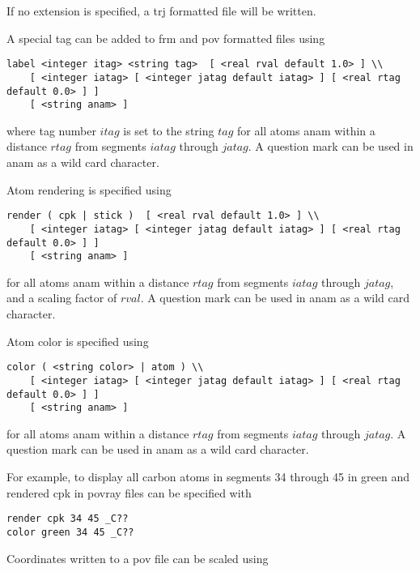 If no extension is specified, a {\rm trj} formatted file will be written.

A special tag can be added to {\rm frm} and {\rm pov} formatted files  using

\begin{verbatim}
label <integer itag> <string tag>  [ <real rval default 1.0> ] \\
    [ <integer iatag> [ <integer jatag default iatag> ] [ <real rtag default 0.0> ] ]
    [ <string anam> ]
\end{verbatim}

where tag number $itag$ is set to the string $tag$ for all atoms
anam within a distance $rtag$ from segments $iatag$ through $jatag$.
A question mark can be used in anam as a wild card character.
\par

Atom rendering is specified using

\begin{verbatim}
render ( cpk | stick )  [ <real rval default 1.0> ] \\
    [ <integer iatag> [ <integer jatag default iatag> ] [ <real rtag default 0.0> ] ]
    [ <string anam> ]
\end{verbatim}

for all atoms anam within a distance $rtag$ from segments $iatag$ through $jatag$,
and a scaling factor of $rval$. A question mark can be used in anam as a wild card 
character.
\par

Atom color is specified using

\begin{verbatim}
color ( <string color> | atom ) \\
    [ <integer iatag> [ <integer jatag default iatag> ] [ <real rtag default 0.0> ] ]
    [ <string anam> ]
\end{verbatim}

for all atoms anam within a distance $rtag$ from segments $iatag$ through $jatag$.
A question mark can be used in anam as a wild card character.
\par
For example, to display all carbon atoms in segments 34 through 45 
in green and rendered cpk in povray files can be specified with

\begin{verbatim}
render cpk 34 45 _C??
color green 34 45 _C??
\end{verbatim}

Coordinates written to a pov file can be scaled using

